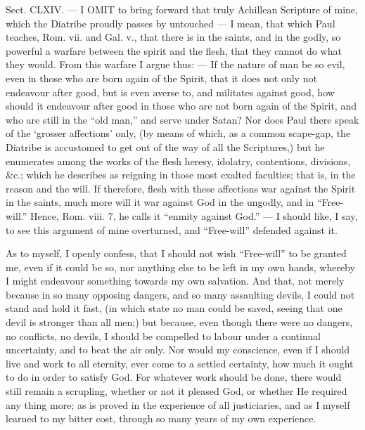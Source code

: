 
Sect. CLXIV. — I \textsc{OMIT} to bring forward that truly Achillean Scripture of mine, which the Diatribe proudly passes by untouched — I mean, that which Paul teaches, Rom. vii. and Gal. v., that there is in the saints, and in the godly, so powerful a warfare between the spirit and the flesh, that they cannot do what they would. From this warfare I argue thus: — If the nature of man be so evil, even in those who are born again of the Spirit, that it does not only not endeavour after good, but is even averse to, and militates against good, how should it endeavour after good in those who are not born again of the Spirit, and who are still in the “old man,” and serve under Satan? Nor does Paul there speak of the ‘grosser affections’ only, (by means of which, as a common scape-gap, the Diatribe is accustomed to get out of the way of all the Scriptures,) but he enumerates among the works of the flesh heresy, idolatry, contentions, divisions, \&c.; which he describes as reigning in those most exalted faculties; that is, in the reason and the will. If therefore, flesh with these affections war against the Spirit in the saints, much more will it war against God in the ungodly, and in “Free-will.” Hence, Rom. viii. 7, he calls it “enmity against God.” — I should like, I say, to see this argument of mine overturned, and “Free-will” defended against it.

As to myself, I openly confess, that I should not wish “Free-will” to be granted me, even if it could be so, nor anything else to be left in my own hands, whereby I might endeavour something towards my own salvation. And that, not merely because in so many opposing dangers, and so many assaulting devils, I could not stand and hold it fast, (in which state no man could be saved, seeing that one devil is stronger than all men;) but because, even though there were no dangers, no conflicts, no devils, I should be compelled to labour under a continual uncertainty, and to beat the air only. Nor would my conscience, even if I should live and work to all eternity, ever come to a settled certainty, how much it ought to do in order to satisfy God. For whatever work should be done, there would still remain a scrupling, whether or not it pleased God, or whether He required any thing more; as is proved in the experience of all justiciaries, and as I myself learned to my bitter cost, through so many years of my own experience.


